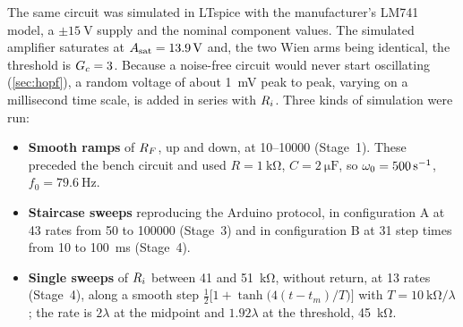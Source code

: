 The same circuit was simulated in LTspice with the manufacturer's LM741 model, a $\pm\SI{15}{\volt}$
supply and the nominal component values. The simulated amplifier saturates at $A_{\mathrm{sat}}=\SI{13.9}{\volt}$
and, the two Wien arms being identical, the threshold is $G_{c}=3$. Because a noise-free circuit would never
start oscillating (\cref{sec:hopf}), a random voltage of about \SI{1}{\milli\volt} peak to peak, varying
on a millisecond time scale, is added in series with $R_{i}$. Three
kinds of simulation were run:
\begin{itemize}
  \item \textbf{Smooth ramps} of $R_{F}$, up and down, at \SIrange{10}{10000}{\ohmpersec} (Stage~1). These
        preceded the bench circuit and used $R=\SI{1}{\kilo\ohm}$, $C=\SI{2}{\micro\farad}$, so
        $\omega_{0}=\SI{500}{\per\second}$, $f_{0}=\SI{79.6}{\hertz}$.
  \item \textbf{Staircase sweeps} reproducing the Arduino protocol, in configuration A at 43 rates from
        \num{50} to \SI{100000}{\ohmpersec} (Stage~3) and in configuration B at 31 step times from \num{10}
        to \SI{100}{\milli\second} (Stage~4).
  \item \textbf{Single sweeps} of $R_{i}$ between \num{41} and \SI{51}{\kilo\ohm}, without return, at 13 rates
        (Stage~4), along a smooth step $\tfrac12\bigl[1+\tanh\bigl(4(t-t_{m})/T\bigr)\bigr]$ with
        $T=\SI{10}{\kilo\ohm}/\lambda$; the rate is $2\lambda$ at the midpoint and $1.92\lambda$ at the
        threshold, \SI{45}{\kilo\ohm}.
\end{itemize}
